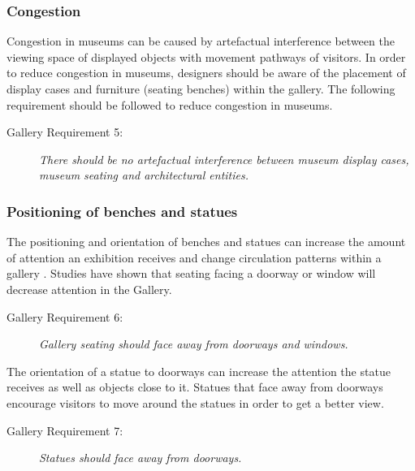 \documentclass[12pt]{ucthesis}
\begin{document}
\subsubsection{Congestion}
Congestion in museums can be caused by artefactual interference between the viewing space of displayed objects with movement pathways of visitors. In order to reduce congestion in museums, designers should be aware of the placement of display cases and furniture (seating benches) within the gallery. The following requirement should be followed to reduce congestion in museums.

\begin{description}
\item[Gallery Requirement 5:] \emph{There should be no artefactual interference between museum display cases, museum seating and architectural entities.}
\end{description}


\subsubsection{Positioning of benches and statues}
The positioning and orientation of benches and statues can increase the amount of attention an exhibition receives and change circulation patterns within a gallery \cite{Stavroulaki} \cite{Museum}. Studies have shown that seating facing a doorway or window will decrease attention in the Gallery.

\begin{description}
\item[Gallery Requirement 6:] \emph{Gallery seating should face away from doorways and windows.}
\end{description}

The orientation of a statue to doorways can increase the attention the statue receives as well as objects close to it. Statues that face away from doorways encourage visitors to move around the statues in order to get a better view.  
\begin{description}
\item[Gallery Requirement 7:] \emph{Statues should face away from doorways.}
\end{description}
\end{document}
